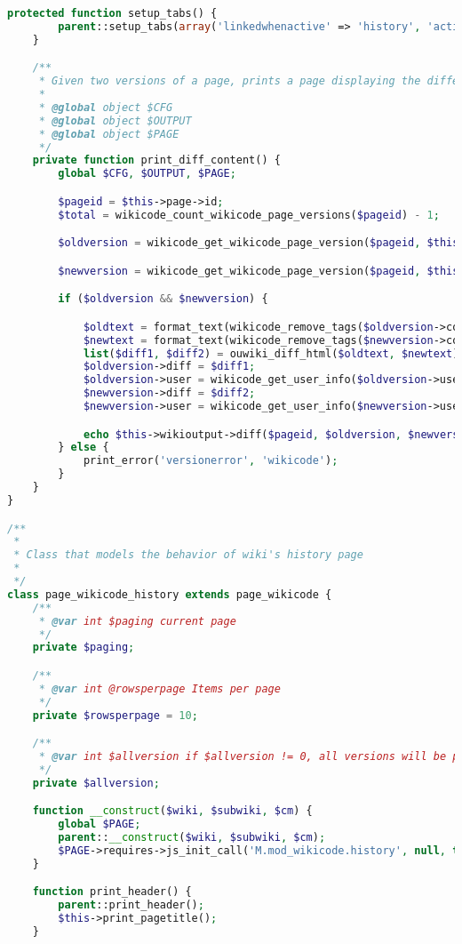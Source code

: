 \begin{lstlisting}[language=PHP]
    protected function setup_tabs() {
        parent::setup_tabs(array('linkedwhenactive' => 'history', 'activetab' => 'history'));
    }

    /**
     * Given two versions of a page, prints a page displaying the differences between them.
     *
     * @global object $CFG
     * @global object $OUTPUT
     * @global object $PAGE
     */
    private function print_diff_content() {
        global $CFG, $OUTPUT, $PAGE;

        $pageid = $this->page->id;
        $total = wikicode_count_wikicode_page_versions($pageid) - 1;

        $oldversion = wikicode_get_wikicode_page_version($pageid, $this->compare);

        $newversion = wikicode_get_wikicode_page_version($pageid, $this->comparewith);

        if ($oldversion && $newversion) {

            $oldtext = format_text(wikicode_remove_tags($oldversion->content), FORMAT_PLAIN, array('overflowdiv'=>true));
			$newtext = format_text(wikicode_remove_tags($newversion->content), FORMAT_PLAIN, array('overflowdiv'=>true));
            list($diff1, $diff2) = ouwiki_diff_html($oldtext, $newtext);
            $oldversion->diff = $diff1;
            $oldversion->user = wikicode_get_user_info($oldversion->userid);
            $newversion->diff = $diff2;
            $newversion->user = wikicode_get_user_info($newversion->userid);

            echo $this->wikioutput->diff($pageid, $oldversion, $newversion, array('total' => $total));
        } else {
            print_error('versionerror', 'wikicode');
        }
    }
}

/**
 *
 * Class that models the behavior of wiki's history page
 *
 */
class page_wikicode_history extends page_wikicode {
    /**
     * @var int $paging current page
     */
    private $paging;

    /**
     * @var int @rowsperpage Items per page
     */
    private $rowsperpage = 10;

    /**
     * @var int $allversion if $allversion != 0, all versions will be printed in a signle table
     */
    private $allversion;

    function __construct($wiki, $subwiki, $cm) {
        global $PAGE;
        parent::__construct($wiki, $subwiki, $cm);
        $PAGE->requires->js_init_call('M.mod_wikicode.history', null, true);
    }

    function print_header() {
        parent::print_header();
        $this->print_pagetitle();
    }


\end{lstlisting}
